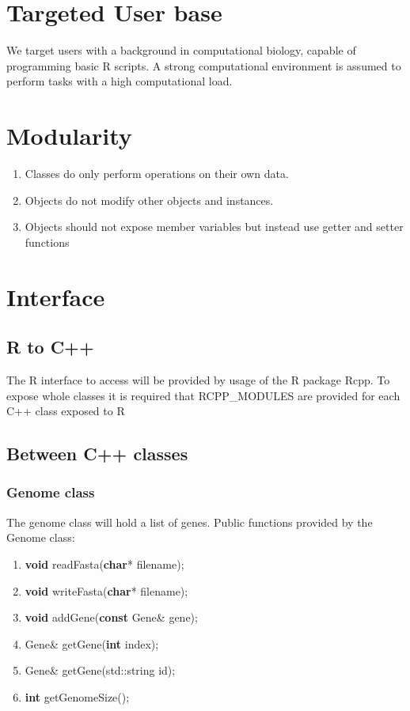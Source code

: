 \documentclass[11pt]{article}
\begin{document}
  \section{Targeted User base}
  We target users with a background in computational biology, capable of programming basic R scripts. A strong computational 
  environment is assumed to perform tasks with a high computational load.
  
  \section{Modularity}
  \begin{enumerate}
   \item Classes do only perform operations on their own data.
   \item Objects do not modify other objects and instances.
   \item Objects should not expose member variables but instead use getter and setter functions
  \end{enumerate}

  \section{Interface}
  \subsection{R to C++}
  The R interface to access will be provided by usage of the R package Rcpp. 
  To expose whole classes it is required that RCPP\_MODULES are provided for each C++ class exposed to R
  
  \subsection{Between C++ classes}
  \subsubsection{Genome class}
  The genome class will hold a list of genes.
  \newline
  Public functions provided by the Genome class:
   \begin{enumerate}
   \item \textbf{void} readFasta(\textbf{char}* filename);
   \item \textbf{void} writeFasta(\textbf{char}* filename);
   \item \textbf{void} addGene(\textbf{const} Gene\& gene);
   \item Gene\& getGene(\textbf{int} index);
   \item Gene\& getGene(std::string id);
   \item \textbf{int} getGenomeSize();
  \end{enumerate} 
  
\end{document}
